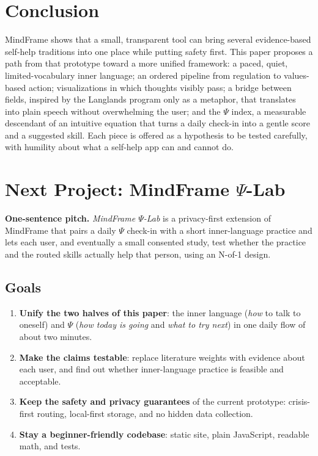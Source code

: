 \documentclass[11pt]{article}
\begin{document}
\section{Conclusion}
MindFrame shows that a small, transparent tool can bring several evidence-based self-help traditions into one place while putting safety first. This paper proposes a path from that prototype toward a more unified framework: a paced, quiet, limited-vocabulary inner language; an ordered pipeline from regulation to values-based action; visualizations in which thoughts visibly pass; a bridge between fields, inspired by the Langlands program only as a metaphor, that translates into plain speech without overwhelming the user; and the $\Psi$ index, a measurable descendant of an intuitive equation that turns a daily check-in into a gentle score and a suggested skill. Each piece is offered as a hypothesis to be tested carefully, with humility about what a self-help app can and cannot do.

\section{Next Project: MindFrame $\Psi$-Lab}\label{sec:next}
\textbf{One-sentence pitch.} \emph{MindFrame $\Psi$-Lab} is a privacy-first extension of MindFrame that pairs a daily $\Psi$ check-in with a short inner-language practice and lets each user, and eventually a small consented study, test whether the practice and the routed skills actually help that person, using an N-of-1 design.

\subsection{Goals}
\begin{enumerate}
\item \textbf{Unify the two halves of this paper}: the inner language (\emph{how} to talk to oneself) and $\Psi$ (\emph{how today is going} and \emph{what to try next}) in one daily flow of about two minutes.
\item \textbf{Make the claims testable}: replace literature weights with evidence about each user, and find out whether inner-language practice is feasible and acceptable.
\item \textbf{Keep the safety and privacy guarantees} of the current prototype: crisis-first routing, local-first storage, and no hidden data collection.
\item \textbf{Stay a beginner-friendly codebase}: static site, plain JavaScript, readable math, and tests.
\end{enumerate}
\end{document}
